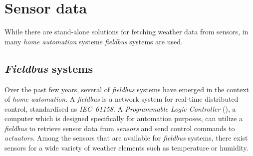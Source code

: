 \section{Sensor data}
\label{sec:weather_sensors}

While there are stand-alone solutions for fetching weather data from sensors, in many \emph{home automation} systems \emph{fieldbus} systems are used.

\subsection{\emph{Fieldbus} systems}
\label{sec:fieldbus}

Over the past few years, several of \emph{fieldbus} systems have emerged in the context of \emph{home automation}. A \emph{fieldbus} is a network system for real-time distributed control\cite{fieldbus}, standardised as \emph{IEC~61158}\cite{IEC61158}. A \emph{Programmable Logic Controller} (), a computer which is designed specifically for automation purposes, can utilize a \emph{fieldbus} to retrieve sensor data from \emph{sensors} and send control commands to \emph{actuators}. Among the sensors that are available for \emph{fieldbus} systems, there exist sensors for a wide variety of weather elements such as temperature or humidity. 

